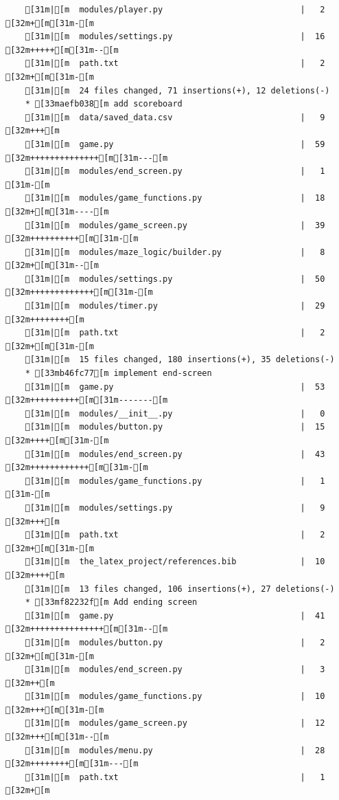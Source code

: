 \documentclass{article}
\begin{document}
{\begin{verbatim}
    [31m|[m  modules/player.py                            |   2 [32m+[m[31m-[m
    [31m|[m  modules/settings.py                          |  16 [32m+++++[m[31m--[m
    [31m|[m  path.txt                                     |   2 [32m+[m[31m-[m
    [31m|[m  24 files changed, 71 insertions(+), 12 deletions(-)
    * [33maefb038[m add scoreboard
    [31m|[m  data/saved_data.csv                          |   9 [32m+++[m
    [31m|[m  game.py                                      |  59 [32m++++++++++++++[m[31m---[m
    [31m|[m  modules/end_screen.py                        |   1 [31m-[m
    [31m|[m  modules/game_functions.py                    |  18 [32m+[m[31m----[m
    [31m|[m  modules/game_screen.py                       |  39 [32m++++++++++[m[31m-[m
    [31m|[m  modules/maze_logic/builder.py                |   8 [32m+[m[31m--[m
    [31m|[m  modules/settings.py                          |  50 [32m+++++++++++++[m[31m-[m
    [31m|[m  modules/timer.py                             |  29 [32m++++++++[m
    [31m|[m  path.txt                                     |   2 [32m+[m[31m-[m
    [31m|[m  15 files changed, 180 insertions(+), 35 deletions(-)
    * [33mb46fc77[m implement end-screen
    [31m|[m  game.py                                      |  53 [32m++++++++++[m[31m-------[m
    [31m|[m  modules/__init__.py                          |   0
    [31m|[m  modules/button.py                            |  15 [32m++++[m[31m-[m
    [31m|[m  modules/end_screen.py                        |  43 [32m++++++++++++[m[31m-[m
    [31m|[m  modules/game_functions.py                    |   1 [31m-[m
    [31m|[m  modules/settings.py                          |   9 [32m+++[m
    [31m|[m  path.txt                                     |   2 [32m+[m[31m-[m
    [31m|[m  the_latex_project/references.bib             |  10 [32m++++[m
    [31m|[m  13 files changed, 106 insertions(+), 27 deletions(-)
    * [33mf82232f[m Add ending screen
    [31m|[m  game.py                                      |  41 [32m+++++++++++++++[m[31m--[m
    [31m|[m  modules/button.py                            |   2 [32m+[m[31m-[m
    [31m|[m  modules/end_screen.py                        |   3 [32m++[m
    [31m|[m  modules/game_functions.py                    |  10 [32m+++[m[31m-[m
    [31m|[m  modules/game_screen.py                       |  12 [32m+++[m[31m--[m
    [31m|[m  modules/menu.py                              |  28 [32m++++++++[m[31m---[m
    [31m|[m  path.txt                                     |   1 [32m+[m

\end{verbatim}}
\end{document}
